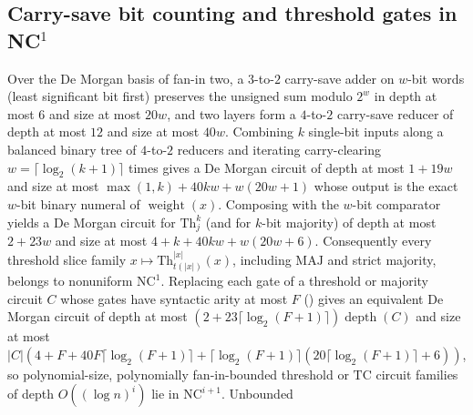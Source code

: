 \begin{result}
\end{result}

\begin{result}
\subsection{Carry-save bit counting and threshold gates in \texorpdfstring{NC$^1$}{NC\^1}}
Over the De Morgan basis of fan-in two, a $3$-to-$2$ carry-save adder on
$w$-bit words (least significant bit first) preserves the unsigned sum modulo
$2^w$ in depth at most $6$ and size at most $20w$, and two layers form a
$4$-to-$2$ carry-save reducer of depth at most $12$ and size at most $40w$.
Combining $k$ single-bit inputs along a balanced binary tree of $4$-to-$2$
reducers and iterating carry-clearing $w=\lceil\log_2(k+1)\rceil$ times gives a
De Morgan circuit  of depth at most $1+19w$ and size at most
$\max(1,k)+40kw+w(20w+1)$ whose output is the exact $w$-bit binary numeral of
$\operatorname{weight}(x)$. Composing with the $w$-bit comparator yields a
De Morgan circuit  for $\mathrm{Th}^k_j$ (and
 for $k$-bit majority) of depth at most $2+23w$
and size at most $4+k+40kw+w(20w+6)$. Consequently every threshold slice family
$x\mapsto\mathrm{Th}^{|x|}_{t(|x|)}(x)$, including $\mathrm{MAJ}$ and strict
majority, belongs to nonuniform $\mathrm{NC}^1$. Replacing each gate of a
threshold or majority circuit $C$ whose gates have syntactic arity at most $F$
() gives an equivalent De Morgan circuit of depth at most
$(2+23\lceil\log_2(F+1)\rceil)\operatorname{depth}(C)$ and size at most
$|C|(4+F+40F\lceil\log_2(F+1)\rceil+\lceil\log_2(F+1)\rceil(20\lceil\log_2(F+1)\rceil+6))$,
so polynomial-size, polynomially fan-in-bounded threshold or $\mathrm{TC}$
circuit families of depth $O((\log n)^i)$ lie in $\mathrm{NC}^{i+1}$. Unbounded

\end{result}
